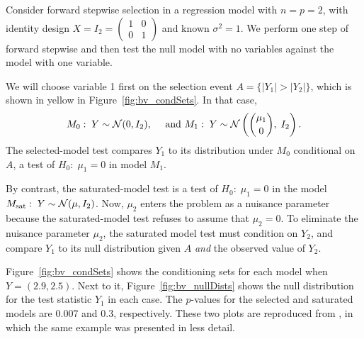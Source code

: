 \documentclass{article}
\begin{document}
\begin{example}\label{ex:bivariate}
  Consider forward stepwise selection in a regression model with $n=p=2$, with identity design $X = I_2=\begin{pmatrix} 1 & 0 \\ 0 & 1\end{pmatrix}$ and known $\sigma^2=1$. We perform one step of forward stepwise and then test the null model with no variables against the model with one variable. 

We will choose variable 1 first on the selection event $A=\{|Y_1| > |Y_2|\}$, which is shown in yellow in Figure~\ref{fig:bv_condSets}. In that case,
\[
M_0:\; Y\sim \mathcal{N}(0,I_2), \quad\text{ and } 
M_1:\; Y \sim \mathcal{N}\left(\binom{\mu_1}{0}, \; I_2\right).
\]
The selected-model test compares $Y_1$ to its distribution under $M_0$ conditional on $A$, a test of $H_0:\;\mu_1=0$ in model $M_1$.

By contrast, the saturated-model test is a test of $H_0:\; \mu_1=0$ in the model $M_{\text{sat}}:\; Y \sim \mathcal{N}(\mu, I_2)$. Now, $\mu_2$ enters the problem as a nuisance parameter because the saturated-model test refuses to assume that $\mu_2=0$. To eliminate the nuisance parameter $\mu_2$, the saturated model test must condition on $Y_2$, and compare $Y_1$ to its null distribution given $A$ {\em and} the observed value of $Y_2$.

Figure~\ref{fig:bv_condSets} shows the conditioning sets for each model when $Y=(2.9,2.5)$. Next to it, Figure~\ref{fig:bv_nullDists} shows the null distribution for the test statistic $Y_1$ in each case. The $p$-values for the selected and saturated models are 0.007 and 0.3, respectively. These two plots are reproduced from \citet{fithian2014optimal}, in which the same example was presented in less detail.
\end{example}
\end{document}
